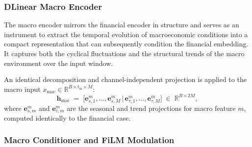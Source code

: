 \documentclass[a4paper,fleqn]{cas-dc}
\begin{document}
\subsubsection{DLinear Macro Encoder}
\label{ssec:enc_mac}
The macro encoder mirrors the financial encoder in structure and serves as an instrument to extract the temporal evolution of macroeconomic conditions into a compact representation that can subsequently condition the financial embedding. It captures both the cyclical fluctuations and the structural trends of the macro environment over the input window.

An identical decomposition and channel-independent projection is applied to the
macro input $x_{\mathrm{mac}} \in \mathbb{R}^{B \times t_{\mathrm{in}} \times  M}$:
\begin{equation}
  \textbf{h}_{\mathrm{mac}} \;=\;
  \bigl[\bm{e}_{s,1}^m,\dots,\bm{e}_{s,M}^m\,\big|\,
        \bm{e}_{\tau,1}^m,\dots,\bm{e}_{\tau,M}^m\bigr]
  \;\in\; \mathbb{R}^{B \times 2M},
\end{equation}
where $\bm{e}_{s,m}^m$ and $\bm{e}_{\tau,m}^m$ are the seasonal and trend projections for macro feature $m$, computed identically to the financial case.

\subsubsection{Macro Conditioner and FiLM Modulation}
\label{ssec:film}
\end{document}
